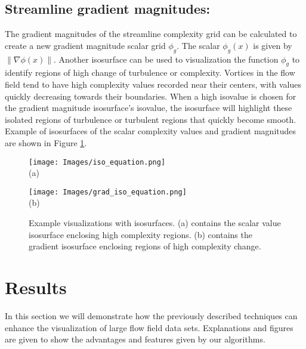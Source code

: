 \documentclass{egpubl}
\begin{document}
\subsection{Streamline gradient magnitudes:}
The gradient magnitudes of the streamline complexity grid can be calculated to create a new gradient magnitude scalar grid $\phi_g$.
The scalar $\phi_g(x)$ is given by $\| \nabla \phi(x) \|$.
Another isosurface can be used to visualization the function $\phi_g$ to identify regions of high change of turbulence or complexity.
Vortices in the flow field tend to have high complexity values recorded near their centers, with values quickly decreasing towards their boundaries.
When a high isovalue is chosen for the gradient magnitude isosurface's isovalue, the isosurface will highlight these isolated regions of turbulence or turbulent regions that quickly become smooth.
Example of isosurfaces of the scalar complexity values and gradient magnitudes are shown in Figure \ref{fig:iso}.

\begin{figure}[h]
        \centering
                \begin{minipage}{0.47\linewidth}
                        \small \centering
                        \texttt{[image: Images/iso\_equation.png]}\\(a)
                \end{minipage}
                \begin{minipage}{0.47\linewidth}
                        \small \centering
                        \texttt{[image: Images/grad\_iso\_equation.png]}\\(b)
                \end{minipage}
        \caption{Example visualizations with isosurfaces. (a) contains the scalar value isosurface enclosing high complexity regions. (b) contains the gradient isosurface enclosing regions of high complexity change.}
        \label{fig:iso}
\end{figure}

\section{Results} \label{sec:examples}

In this section we will demonstrate how the previously described techniques can enhance the visualization of large flow field data sets.
Explanations and figures are given to show the advantages and features given by our algorithms.
\end{document}
